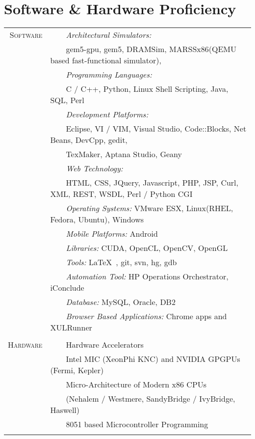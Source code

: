 \documentclass[a4paper,10pt]{article} %
\newcommand{\tabitem}{~~\llap{\textbullet}~~}
\begin{document}
\newpage

\section{Software \& Hardware Proficiency}
\begin{tabular}{rl}
\textsc{Software} & \tabitem \textit{Architectural Simulators:}\\
& ~~~~gem5-gpu, gem5, DRAMSim, MARSSx86(QEMU based fast-functional simulator),\\
& \tabitem \textit{Programming Languages:}\\
& ~~~~C / C++, Python, Linux Shell Scripting, Java, SQL, Perl\\
& \tabitem \textit{Development Platforms:} \\
& ~~~~Eclipse, VI / VIM, Visual Studio, Code::Blocks, Net Beans, DevCpp, gedit,\\
& ~~~~TexMaker, Aptana Studio, Geany\\	
& \tabitem \textit{Web Technology:} \\
& ~~~~HTML, CSS, JQuery, Javascript, PHP, JSP, Curl, XML, REST, WSDL, Perl / Python CGI\\
& \tabitem \textit{Operating Systems:} VMware ESX, Linux(RHEL, Fedora, Ubuntu), Windows \\
& \tabitem \textit{Mobile Platforms:} Android \\
& \tabitem \textit{Libraries:} CUDA, OpenCL, OpenCV, OpenGL  \\
& \tabitem \textit{Tools:} \LaTeX\ , git, svn, hg, gdb\\
& \tabitem \textit{Automation Tool:} HP Operations Orchestrator, iConclude \\
& \tabitem \textit{Database:} MySQL, Oracle, DB2 \\
& \tabitem \textit{Browser Based Applications:} Chrome apps and XULRunner \\

&\\

\textsc{Hardware}  & \tabitem Hardware Accelerators \\
& ~~~~Intel MIC (XeonPhi KNC) and NVIDIA GPGPUs (Fermi, Kepler) \\
& \tabitem Micro-Architecture of Modern x86 CPUs\\
& ~~~~(Nehalem / Westmere, SandyBridge / IvyBridge, Haswell) \\ 
& \tabitem 8051 based Microcontroller Programming \\
&\\
\end{tabular}
\\
\end{document}
